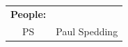 \documentclass[10pt]{article}
\begin{document}
\begin{center}
\vspace{1em}
\begin{tabular}{|c|c|}\hline %
{\bf People: } & \\
PS & Paul Spedding \\
    \hline
\end{tabular}
\end{center}
\end{document}
